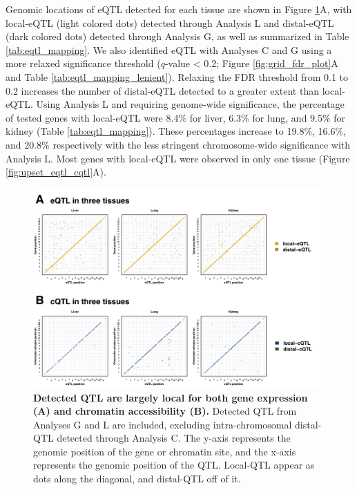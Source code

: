 \documentclass[9pt,twocolumn,twoside]{gsajnl}
\begin{document}
Genomic locations of eQTL detected for each tissue are shown in Figure \ref{fig:grid_plot}A, with local-eQTL (light colored dots) detected through Analysis L and distal-eQTL (dark colored dots) detected through Analysis G, as well as summarized in Table \ref{tab:eqtl_mapping}. 
We also identified eQTL with Analyses C and G using a more relaxed significance threshold ($q$-value < 0.2; Figure \ref{fig:grid_fdr_plot}A and Table \ref{tab:eqtl_mapping_lenient}). Relaxing the FDR threshold from 0.1 to 0.2 increases the number of distal-eQTL detected to a greater extent than local-eQTL. Using Analysis L and requiring genome-wide significance, the percentage of tested genes with local-eQTL were 8.4\% for liver, 6.3\% for lung, and 9.5\% for kidney (Table \ref{tab:eqtl_mapping}). These percentages increase to 19.8\%, 16.6\%, and 20.8\% respectively with the less stringent chromosome-wide significance with Analysis L. Most genes with local-eQTL were observed in only one tissue (Figure \ref{fig:upset_eqtl_cqtl}A).

\begin{figure}[h]
\renewcommand{\familydefault}{\sfdefault}\normalfont
\centering
\includegraphics[width=\textwidth, trim={0in 0in 0in 0in}, clip]{figs/qtl_map_main.png}
\caption{\textbf{Detected QTL are largely local for both gene expression (A) and chromatin accessibility (B).} Detected QTL from Analyses G and L are included, excluding intra-chromosomal distal-QTL detected through Analysis C. The y-axis represents the genomic position of the gene or chromatin site, and the x-axis represents the genomic position of the QTL. Local-QTL appear as dots along the diagonal, and distal-QTL off of it.
\label{fig:grid_plot}}
\end{figure}
\end{document}
